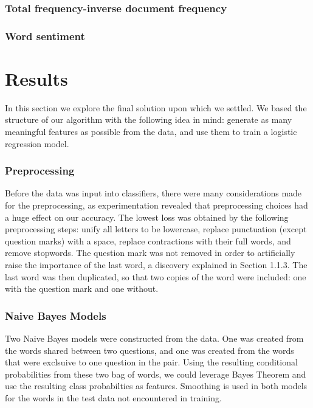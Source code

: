 \documentclass{article}
\begin{document}
\subsubsection{Total frequency-inverse document frequency}

\subsubsection{Word sentiment}

\section{Results}

In this section we explore the final solution upon which we settled. We based the structure of our algorithm with the following idea in mind: generate as many meaningful features as possible from the data, and use them to train a logistic regression model. 

\subsubsection{Preprocessing}

Before the data was input into classifiers, there were many considerations made for the preprocessing, as experimentation revealed that preprocessing choices had a huge effect on our accuracy. The lowest loss was obtained by the following preprocessing steps: unify all letters to be lowercase, replace punctuation (except question marks) with a space, replace contractions with their full words, and remove stopwords. The question mark was not removed in order to artificially raise the importance of the last word, a discovery explained in Section 1.1.3. The last word was then duplicated, so that two copies of the word were included: one with the question mark and one without.

\subsubsection{Naive Bayes Models}

Two Naive Bayes models were constructed from the data. One was created from the words shared between two questions, and one was created from the words that were exclsuive to one question in the pair. Using the resulting conditional probabilities from these two bag of words, we could leverage Bayes Theorem and use the resulting class probabilties as features. Smoothing is used in both models for the words in the test data not encountered in training.  
\end{document}
